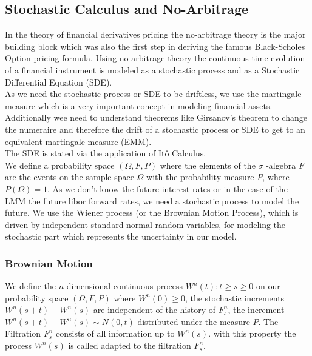 \documentclass[11pt]{article}
\numberwithin{equation}{subsection}
\begin{document}
\subsection{Stochastic Calculus and No-Arbitrage}
In the theory of financial derivatives pricing the no-arbitrage theory is the major building block which was also the first step in deriving the famous Black-Scholes Option pricing formula. Using no-arbitrage theory the continuous time evolution of a financial instrument is modeled as a stochastic process and as a Stochastic Differential Equation (SDE).\\ 
As we need the stochastic process or SDE to be driftless, we use the martingale measure which is a very important concept in modeling financial assets.\\
Additionally wee need to understand theorems like Girsanov's theorem to change the numeraire and therefore the drift of a stochastic process or SDE to get to an equivalent martingale measure (EMM).\\
The SDE is stated via the application of Itô Calculus.\\
We define a probability space \((\Omega, F, P)\) where the elements of the \(\sigma\) -algebra \(F\) are the events on the sample space \(\Omega\) with the probability measure \(P\), where \(P(\Omega)=1\). As we don't know the future interest rates or in the case of the LMM the future libor forward rates, we need a stochastic process to model the future. We use the Wiener process (or the Brownian Motion Process), which is driven by independent standard normal random variables, for modeling the stochastic part which represents the uncertainty in our model.
\subsubsection{Brownian Motion}		
We define the \(n\)-dimensional continuous process \(W^{n}(t): t\geq s\geq 0\) on our probability space \((\Omega, F, P)\) where \(W^n(0) \geq 0\), the stochastic increments \(W^{n}(s+t)-W^{n}(s)\) are independent of the history of \(F_s^{n}\), the increment \(W^{n}(s+t)-W^{n}(s) \sim N(0, t)\) distributed under the measure \(P\). The Filtration \(F_s^n\) consists of all information up to \(W^n(s)\). with this property the process \(W^{n}(s)\) is called adapted to the filtration \(F_s^n\).
\end{document}
